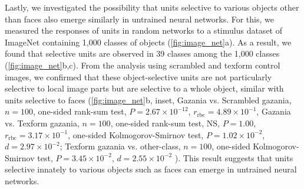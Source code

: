 \documentclass[sn-mathphys-num]{sn-jnl}%
\theoremstyle{thmstyleone}%
\theoremstyle{thmstyletwo}%
\theoremstyle{thmstylethree}%
\begin{document}
Lastly, we investigated the possibility that units selective to various objects other than faces also emerge similarly in untrained neural networks.
For this, we measured the responses of units in random networks to a stimulus dataset of ImageNet containing 1,000 classes of objects (\ref{fig:image_net}a).
As a result, we found that selective units are observed in 39 classes among the 1,000 classes (\ref{fig:image_net}b,c).
From the analysis using scrambled and texform control images, we confirmed that these object-selective units are not particularly selective to local image parts but are selective to a whole object, similar with units selective to faces
(\ref{fig:image_net}b, inset,
Gazania vs. Scrambled gazania, 
$ n=100 $,
one-sided rank-sum test,
$ P = 2.67 \times 10^{-12} $,
$ r_\textrm{rbc} = 4.89 \times 10^{-1} $,
%
Gazania vs. Texform gazania, 
$ n = 100 $,
one-sided rank-sum test, NS,
$ P = 1.00 $,
$ r_\textrm{rbc} = 3.17 \times 10^{-1} $,
one-sided Kolmogorov-Smirnov test,
$ P = 1.02 \times 10^{-2} $,
$ d = 2.97 \times 10^{-2} $;
% 
Texform gazania vs. other-class,
$ n = 100 $,
one-sided Kolmogorov-Smirnov test,
$ P = 3.45 \times 10^{-2} $,
$ d = 2.55 \times 10^{-2} $
).
This result suggests that units selective innately to various objects such as faces can emerge in untrained neural networks.
\end{document}
